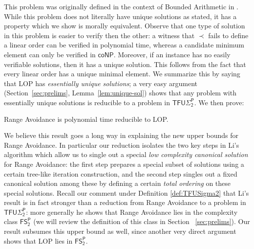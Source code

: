 This problem was originally defined in the context of Bounded Arithmetic in \cite{Chiari1998-CHIWFI}. While this problem does not literally have unique solutions as stated, it has a property which we show is morally equivalent. Observe that one type of solution in this problem is easier to verify then the other: a witness that $\prec$ fails to define a linear order can be verified in polynomial time, whereas a candidate minimum element can only be verified in $\mathsf{coNP}$. Moreover, if an instance has no easily verifiable solutions, then it has a unique solution. This follows from the fact that every linear order has a unique minimal element. We summarize this by saying that {\sc LOP} has \emph{essentially unique solutions}; a very easy argument (Section~\ref{sec:prelims}, Lemma~\ref{lem:unique-sol}) shows that any problem with essentially unique solutions is reducible to a problem in $\mathsf{TFU\Sigma_2^P}$. We then prove:

\begin{theorem}\label{thm:avoid-to-lop-intro}

Range Avoidance is polynomial time reducible to {\sc LOP}.
\end{theorem}

We believe this result goes a long way in explaining the new upper bounds for Range Avoidance. In particular our reduction isolates the two key steps in Li's algorithm which allow us to single out a special \emph{low complexity canonical solution} for Range Avoidance: the first step prepares a special subset of solutions using a certain tree-like iteration construction, and the second step singles out a fixed canonical solution among these by defining a certain \emph{total ordering} on these special solutions.  Recall our comment under Definition \ref{def:TFUSigma2} that Li's result is in fact stronger than a reduction from Range Avoidance to a problem in $\mathsf{TFU\Sigma_2^P}$: more generally he shows that Range Avoidance lies in the complexity class $\mathsf{FS_2^P}$ (we will review the definition of this class in Section ~\ref{sec:prelims}). Our result subsumes this upper bound as well, since another very direct argument shows that {\sc LOP} lies in $\mathsf{FS_2^P}$. 

